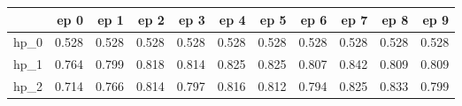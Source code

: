 \begin{tabular}{lrrrrrrrrrr}
\toprule
{} &   ep 0 &   ep 1 &   ep 2 &   ep 3 &   ep 4 &   ep 5 &   ep 6 &   ep 7 &   ep 8 &   ep 9 \\
\midrule
hp\_0 &  0.528 &  0.528 &  0.528 &  0.528 &  0.528 &  0.528 &  0.528 &  0.528 &  0.528 &  0.528 \\
hp\_1 &  0.764 &  0.799 &  0.818 &  0.814 &  0.825 &  0.825 &  0.807 &  0.842 &  0.809 &  0.809 \\
hp\_2 &  0.714 &  0.766 &  0.814 &  0.797 &  0.816 &  0.812 &  0.794 &  0.825 &  0.833 &  0.799 \\
\bottomrule
\end{tabular}
